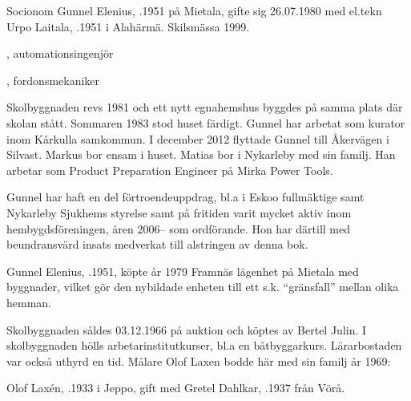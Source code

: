 %
Socionom Gunnel Elenius, .1951 på Mietala, gifte sig 26.07.1980 med el.tekn Urpo Laitala, .1951 i Alahärmä. Skilsmässa 1999.
\begin{jhchildren}
  \item {}, automationsingenjör
  \item {}, fordonsmekaniker
\end{jhchildren}

Skolbyggnaden revs 1981 och ett nytt egnahemshus byggdes på samma plats där skolan stått. Sommaren 1983 stod huset färdigt. Gunnel har arbetat som kurator inom Kårkulla samkommun. I december 2012 flyttade Gunnel till Åkervägen i Silvast. Markus bor ensam i huset. Matias bor i Nykarleby med sin familj. Han arbetar som Product Preparation Engineer på Mirka Power Tools.

Gunnel har haft en del förtroendeuppdrag, bl.a i  Eskoo fullmäktige samt Nykarleby Sjukhems styrelse samt på fritiden varit mycket aktiv inom hembygdsföreningen, åren 2006-- som ordförande. Hon har därtill med beundransvärd insats medverkat till alstringen av denna bok.



%


%
Gunnel Elenius, .1951, köpte år 1979 Framnäs lägenhet på Mietala med byggnader, vilket gör den nybildade enheten till ett s.k. ``gränsfall'' mellan olika hemman.\jhvspace{}


%
Skolbyggnaden såldes 03.12.1966 på auktion och köptes av Bertel Julin. I skolbyggnaden hölls arbetarinstitutkurser, bl.a en båtbyggarkurs. Lärarbostaden var också uthyrd en tid. Målare Olof Laxen bodde här med sin familj år 1969:

Olof Laxén, .1933 i Jeppo, gift med Gretel Dahlkar, .1937 från Vörå.
\begin{jhchildren}
  \item {}
  \item {}
\end{jhchildren}

